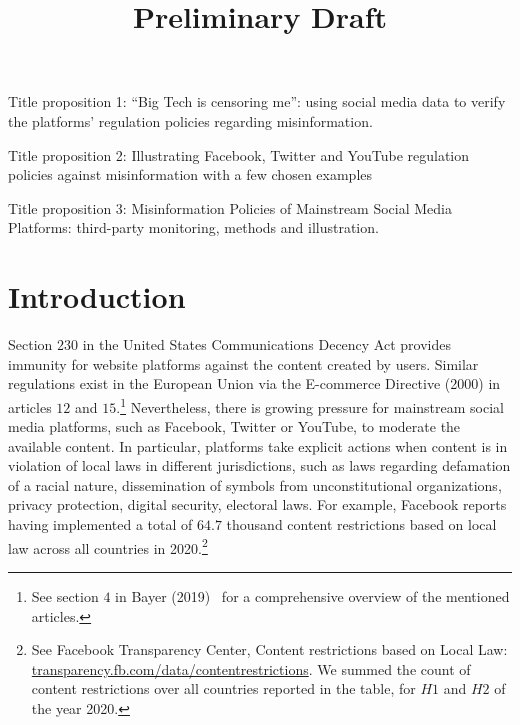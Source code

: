 \documentclass{article}
\begin{document}
\title{Preliminary Draft}

\maketitle

Title proposition 1: ``Big Tech is censoring me'': using social media data to verify the platforms' regulation policies regarding misinformation. 

Title proposition 2: Illustrating Facebook, Twitter and YouTube regulation policies against misinformation with a few chosen examples

Title proposition 3: Misinformation Policies of Mainstream Social Media Platforms: third-party monitoring, methods and illustration.

\tableofcontents

\section{Introduction}

Section $230$ in the United States Communications Decency Act provides immunity for website platforms against the content created by users. Similar regulations exist in the European Union via the E-commerce Directive (2000) in articles $12$ and $15$.\footnote{See section $4$ in Bayer (2019)~\cite{Bayer} for a comprehensive overview of the mentioned articles.} Nevertheless, there is growing pressure for mainstream social media platforms, such as Facebook, Twitter or YouTube, to moderate the available content. In particular, platforms take explicit actions when content is in violation of local laws in different jurisdictions, such as laws regarding defamation of a racial nature, dissemination of symbols from unconstitutional organizations, privacy protection, digital security, electoral laws. For example, Facebook reports having implemented a total of $64.7$ thousand content restrictions based on local law across all countries in 2020.\footnote{See Facebook Transparency Center, Content restrictions based on Local Law: \href{https://transparency.fb.com/data/content\-restrictions}{transparency.fb.com/data/content\-restrictions}. We summed the count of content restrictions over all countries reported in the table, for $H1$ and $H2$ of the year 2020.} %
\end{document}

